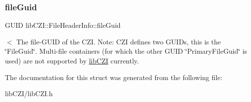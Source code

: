 \subsubsection{\texorpdfstring{file\+Guid}{fileGuid}}
{\footnotesize\ttfamily G\+U\+ID lib\+C\+Z\+I\+::\+File\+Header\+Info\+::file\+Guid}

$<$ The file-\/\+G\+U\+ID of the C\+ZI. Note\+: C\+ZI defines two G\+U\+I\+Ds, this is the \char`\"{}\+File\+Guid\char`\"{}. Multi-\/file containers (for which the other G\+U\+ID \char`\"{}\+Primary\+File\+Guid\char`\"{} is used) are not supported by \hyperlink{namespacelib_c_z_i}{lib\+C\+ZI} currently. 

The documentation for this struct was generated from the following file\+:\begin{DoxyCompactItemize}
\item 
lib\+C\+Z\+I/lib\+C\+Z\+I.\+h\end{DoxyCompactItemize}
